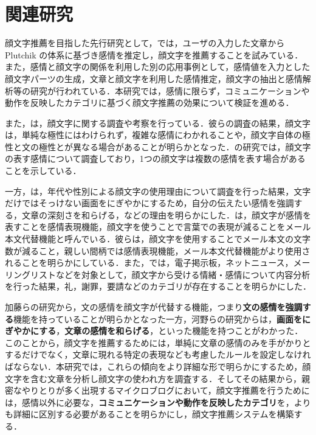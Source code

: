 \documentclass[japanese]{jnlp_1.4}
\begin{document}
\section{関連研究}
\label{sec:related}

顔文字推薦を目指した先行研究として，では，ユーザの入力した文章から Plutchik の体系に基づき感情を推定し，顔文字を推薦することを試みている．また，感情と顔文字の関係を利用した別の応用事例として，感情値を入力とした顔文字パーツの生成\cite{nakamura2003b}，文章と顔文字を利用した感情推定\cite{shino}，顔文字の抽出と感情解析\cite{ptas2010b}等の研究が行われている．本研究では，感情に限らず，コミュニケーションや動作を反映したカテゴリに基づく顔文字推薦の効果について検証を進める．

また，は，顔文字に関する調査や考察を行っている．彼らの調査の結果，顔文字は，単純な極性にはわけられず，複雑な感情にわかれることや，顔文字自体の極性と文の極性とが異なる場合があることが明らかとなった．の研究では，顔文字の表す感情について調査しており，1つの顔文字は複数の感情を表す場合があることを示している．

一方，は，年代や性別による顔文字の使用理由について調査を行った結果，文字だけではそっけない画面をにぎやかにするため，自分の伝えたい感情を強調する，文章の深刻さを和らげる，などの理由を明らかにした．は，顔文字が感情を表すことを感情表現機能，顔文字を使うことで言葉での表現が減ることをメール本文代替機能と呼んでいる．彼らは，顔文字を使用することでメール本文の文字数が減ること，親しい間柄では感情表現機能，メール本文代替機能がより使用されることを明らかにしている．また，では，電子掲示板，ネットニュース，メーリングリストなどを対象として，顔文字から受ける情緒・感情について内容分析を行った結果，礼，謝罪，要請などのカテゴリが存在することを明らかにした．

加藤らの研究から，文の感情を顔文字が代替する機能，つまり{\bf 文の感情を強調する}機能を持っていることが明らかとなった一方，河野らの研究からは，{\bf 画面をにぎやかにする}，{\bf 文章の感情を和らげる}，といった機能を持つことがわかった．このことから，顔文字を推薦するためには，単純に文章の感情のみを手がかりとするだけでなく，文章に現れる特定の表現なども考慮したルールを設定しなければならない．本研究では，これらの傾向をより詳細な形で明らかにするため，顔文字を含む文章を分析し顔文字の使われ方を調査する．そしてその結果から，親密なやりとりが多く出現するマイクロブログにおいて，顔文字推薦を行うためには，感情以外に必要な，{\bf コミュニケーションや動作を反映したカテゴリ}を，よりも詳細に区別する必要があることを明らかにし，顔文字推薦システムを構築する．
\end{document}
